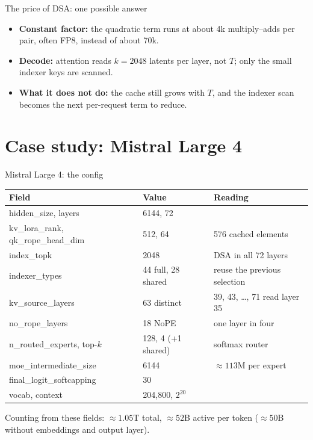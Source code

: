 \documentclass[handout]{beamer}
\begin{document}
\begin{frame}{The price of DSA: one possible answer}
  \begin{itemize}
      \setlength{\itemsep}{8pt}
    \item \textbf{Constant factor:} the quadratic term runs at about 4k multiply--adds per pair, often FP8, instead of about 70k.
    \item \textbf{Decode:} attention reads $k=2048$ latents per layer, not $T$; only the small indexer keys are scanned.
    \item \textbf{What it does not do:} the cache still grows with $T$, and the indexer scan becomes the next per-request term to reduce.
  \end{itemize}
\end{frame}

\section{Case study: Mistral Large 4}

\begin{frame}{Mistral Large 4: the config}
  \footnotesize
  \begin{tabular}{@{}>{\ttfamily}l l l@{}}
    \toprule
    \normalfont Field & Value & Reading \\
    \midrule
    hidden\_size, layers & 6144, 72 & \\
    kv\_lora\_rank, qk\_rope\_head\_dim & 512, 64 & 576 cached elements \\
    index\_topk & 2048 & DSA in all 72 layers \\
    indexer\_types & 44 full, 28 shared & reuse the previous selection \\
    kv\_source\_layers & 63 distinct & 39, 43, \ldots, 71 read layer 35 \\
    no\_rope\_layers & 18 NoPE & one layer in four \\
    n\_routed\_experts, top-$k$ & 128, 4 (+1 shared) & softmax router \\
    moe\_intermediate\_size & 6144 & $\approx113$M per expert \\
    final\_logit\_softcapping & 30 & \\
    vocab, context & 204,800, $2^{20}$ & \\
    \bottomrule
  \end{tabular}
  \par\vspace{8pt}
  \small Counting from these fields: $\approx1.05$T total, $\approx52$B active per token ($\approx50$B without embeddings and output layer).
\end{frame}
\end{document}
